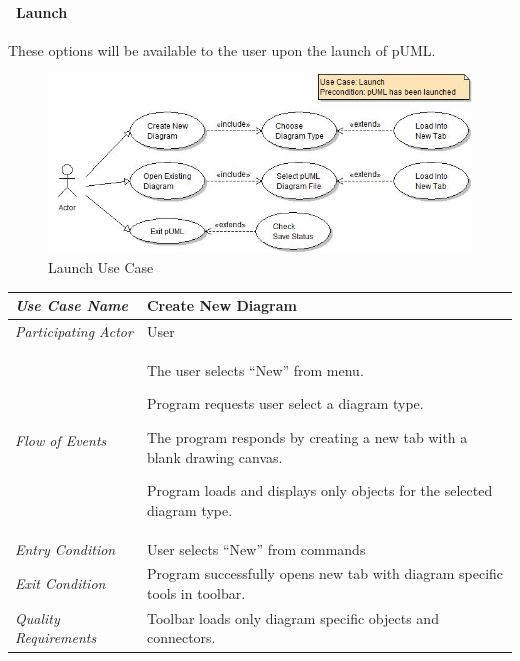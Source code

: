\documentclass[twoside,letterpaper]{article}
\newenvironment{my_enumerate}{
\begin{enumerate}
  \setlength{\itemsep}{1pt}
  \setlength{\parskip}{0pt}
  \setlength{\parsep}{0pt}}{\end{enumerate}
}
\begin{document}
\paragraph[\ Use Category]
{\ Launch} {These options will be available to the user upon the launch of pUML.}

\begin{figure}[h]
\centering
\includegraphics[width=6.0in]{ucaseLaunch.jpg}
\caption{Launch Use Case}
\end{figure}

\begin{flushleft}
\tablehead{}
\begin{tabular}{|m{2.0in} m{5.0in}|}
\hline
{\bfseries\emph{Use Case Name}}
& {\bfseries Create New Diagram }
\\\hline
\emph{Participating Actor}
& User
\\\hline
\emph{Flow of Events}
& \begin{my_enumerate}
\item The user selects ``New'' from menu.
\item Program requests user select a diagram type.
\item The program responds by creating a new tab with a blank drawing canvas.
\item Program loads and displays only objects for the selected diagram type.
\end{my_enumerate}
\\\hline
\emph{Entry Condition}
& User selects ``New'' from commands
\\\hline
\emph{Exit Condition}
& Program successfully opens new tab with diagram specific tools in toolbar.
\\\hline
\emph{Quality Requirements}
& Toolbar loads only diagram specific objects and connectors.
\\\hline
\end{tabular}
\end{flushleft}
\end{document}
